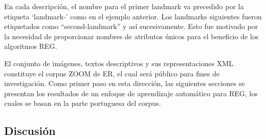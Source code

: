 

En cada descripci\'on, el nombre para el primer landmark va precedido por la etiqueta `landmark-' como en el ejemplo anterior. Los landmarks siguientes fueron etiquetados como ``second-landmark'' y as\'{i} sucesivamente. Esto fue motivado por la necesidad de proporcionar nombres de atributos \'unicos para el beneficio de los algoritmos REG.

El conjunto de im\'agenes, textos descriptivos y sus representaciones XML constituye el corpus ZOOM de ER, el cual ser\'a p\'ublico para fines de investigaci\'on. Como primer paso en esta direcci\'on, las siguientes secciones se presentan los resultados de un enfoque de aprendizaje autom\'atico para REG, los cuales se basan en la parte portuguesa del corpus.


\subsection{Discusi\'on}
\label{corpus-discusion}


